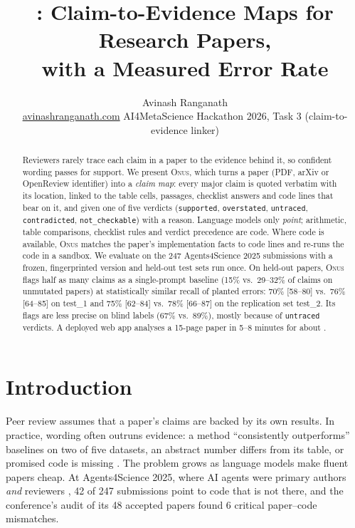 \documentclass[10pt,twocolumn,twoside,letterpaper]{article}
\title{\vspace{-2.2em}\Large\bfseries \onus{}: Claim-to-Evidence Maps for Research Papers,\\with a Measured Error Rate}
\author{Avinash Ranganath\\[1pt]{\small \href{https://avinashranganath.com}{avinashranganath.com} \quad AI4MetaScience Hackathon 2026, Task 3 (claim-to-evidence linker)}}
\date{\vspace{-2.5em}}
\newcommand{\onus}{\textsc{Onus}}
\newcommand{\verdict}[1]{\texttt{#1}}
\begin{document}
\maketitle
\thispagestyle{fancy}

\begin{abstract}
\noindent
Reviewers rarely trace each claim in a paper to the evidence behind it, so confident wording passes for
support. We present \onus{}, which turns a paper (PDF, arXiv or OpenReview identifier) into a \emph{claim
map}: every major claim is quoted verbatim with its location, linked to the table cells, passages, checklist
answers and code lines that bear on it, and given one of five verdicts (\verdict{supported},
\verdict{overstated}, \verdict{untraced}, \verdict{contradicted}, \verdict{not\_checkable}) with a reason.
Language models only \emph{point}; arithmetic, table comparisons, checklist rules and verdict precedence are
code. Where code is available, \onus{} matches the paper's implementation facts to code lines and re-runs the
code in a sandbox. We evaluate on the 247 Agents4Science 2025 submissions with a frozen, fingerprinted
version and held-out test sets run once. On held-out papers, \onus{} flags half as many claims as a
single-prompt baseline (15\% vs.\ 29--32\% of claims on unmutated papers) at statistically similar recall of
planted errors: 70\% [58--80] vs.\ 76\% [64--85] on test\_1 and 75\% [62--84] vs.\ 78\% [66--87] on the
replication set test\_2. Its flags are less precise on blind labels (67\% vs.\ 89\%), mostly because of
\verdict{untraced} verdicts. A deployed web app analyses a 15-page paper in 5--8 minutes for about
.
\end{abstract}

\section{Introduction}
Peer review assumes that a paper's claims are backed by its own results. In practice, wording often outruns
evidence: a method ``consistently outperforms'' baselines on two of five datasets, an abstract number differs
from its table, or promised code is missing \citep{lipton2019troubling}. The problem grows as language models
make fluent papers cheap. At Agents4Science 2025, where AI agents were primary authors \emph{and} reviewers
\citep{bianchi2025agents4science}, 42 of 247 submissions point to code that is not there, and the
conference's audit of its 48 accepted papers found 6 critical paper--code mismatches.
\end{document}
